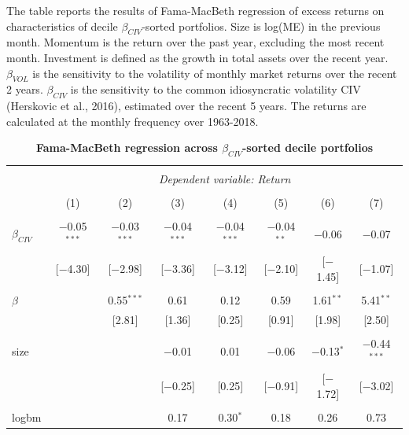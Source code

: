 \documentclass[12pt]{article}
\begin{document}
\begin{table}[!htbp] \centering 
  \caption{\textbf{Fama-MacBeth regression across $\beta_{CIV}$-sorted decile portfolios}} 
  \label{} 
  \begin{flushleft}
    {\medskip\small
The table reports the results of Fama-MacBeth regression of excess returns on characteristics of decile $\beta_{CIV}$-sorted portfolios. Size is log(ME) in the previous month. Momentum is the return over the past year, excluding the most recent month. Investment is defined as the growth in total assets over the recent year. $\beta_{VOL}$ is the sensitivity to the volatility of monthly market returns over the recent 2 years. $\beta_{CIV}$ is the sensitivity to the common idiosyncratic volatility CIV (Herskovic et al., 2016), estimated over the recent 5 years. The returns are calculated at the monthly frequency over 1963-2018.}
    \medskip
    \end{flushleft}
\begin{tabular}{@{\extracolsep{5pt}}lccccccc} 
\\[-1.8ex]\hline 
\hline \\[-1.8ex] 
 & \multicolumn{7}{c}{\textit{Dependent variable: Return}} \\ 
\cline{2-8} 
\\[-1.8ex] & (1) & (2) & (3) & (4) & (5) & (6) & (7)\\ 
\hline \\[-1.8ex] 
 $\beta_{CIV}$ & $-$0.05$^{***}$ & $-$0.03$^{***}$ & $-$0.04$^{***}$ & $-$0.04$^{***}$ & $-$0.04$^{**}$ & $-$0.06 & $-$0.07 \\ 
  & [$-$4.30] & [$-$2.98] & [$-$3.36] & [$-$3.12] & [$-$2.10] & [$-$1.45] & [$-$1.07] \\ 
  & & & & & & & \\ 
 $\beta$ &  & 0.55$^{***}$ & 0.61 & 0.12 & 0.59 & 1.61$^{**}$ & 5.41$^{**}$ \\ 
  &  & [2.81] & [1.36] & [0.25] & [0.91] & [1.98] & [2.50] \\ 
  & & & & & & & \\ 
 size &  &  & $-$0.01 & 0.01 & $-$0.06 & $-$0.13$^{*}$ & $-$0.44$^{***}$ \\ 
  &  &  & [$-$0.25] & [0.25] & [$-$0.91] & [$-$1.72] & [$-$3.02] \\ 
  & & & & & & & \\ 
 logbm &  &  & 0.17 & 0.30$^{*}$ & 0.18 & 0.26 & 0.73 \\ 

\end{tabular}
\end{table}
\end{document}

